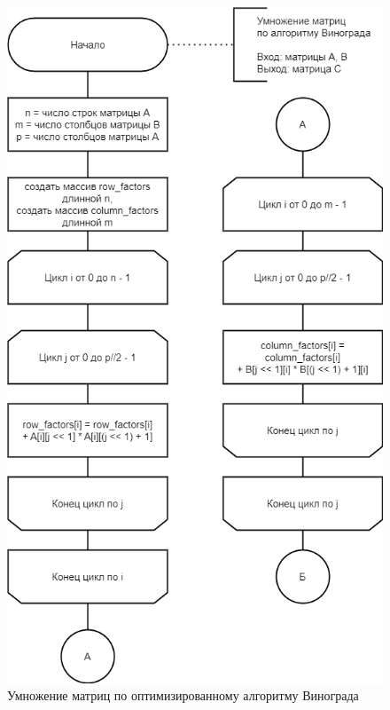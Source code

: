 \begin{figure}[H]
	\begin{center}
		\includegraphics[scale=0.6]{img/optimized_winograd1.png}
	\end{center}
	\captionsetup{justification=centering}
	\caption{Умножение матриц по оптимизированному алгоритму Винограда}
	\label{img:optimized_winograd1}
\end{figure}

